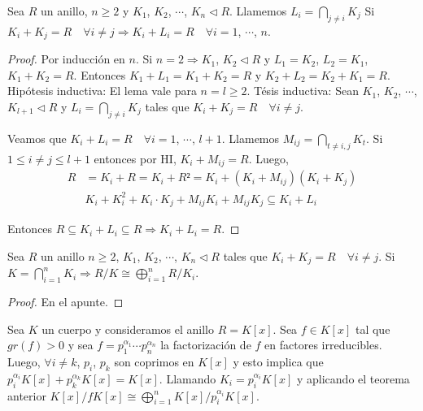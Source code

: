 \begin{lemma}
    Sea \(R\) un anillo, \(n \geq 2\) y \(K_1\), \(K_2\), \(\cdots\), \(K_n \triangleleft R\).
    Llamemos \(L_i = \bigcap_{j \neq i} K_j\) Si \(K_i + K_j = R \quad \forall i \neq j \Rightarrow K_i + L_i = R \quad \forall i = 1\), \(\cdots\), \(n\).
    \begin{proof}
        Por inducción en \(n\).
        Si \(n = 2 \Rightarrow K_1\), \(K_2 \triangleleft R\) y \(L_1 = K_2\), \(L_2 = K_1\), \(K_1 + K_2 = R\).
        Entonces \(K_1 + L_1 = K_1 + K_2 = R\) y \(K_2 + L_2 = K_2 + K_1 = R\).
        Hipótesis inductiva: El lema vale para \(n = l \geq 2\).
        Tésis inductiva: Sean \(K_1\), \(K_2\), \(\cdots\), \(K_{l+1} \triangleleft R\) y \(L_i = \bigcap_{j \neq i} K_j\) tales que \(K_i + K_j = R \quad \forall i \neq j\).

        Veamos que \(K_i + L_i = R \quad \forall i = 1\), \(\cdots\), \(l+1\).
        Llamemos \(M_{ij} = \bigcap_{t \neq i,j} K_t\). Si \(1 \leq i \neq j \leq l+1\) entonces por HI, \(K_i + M_{ij} = R\). Luego, \begin{align*}
            R & = K_i + R = K_i + R² = K_i + (K_i + M_{ij}) (K_i + K_j)                   \\
              & K_i + K_i^2 + K_i \cdot K_j + M_{ij} K_i + M_{ij} K_j \subseteq K_i + L_i
        \end{align*}

        Entonces \(R \subseteq K_i + L_i \subseteq R \Rightarrow K_i + L_i = R\).
    \end{proof}
\end{lemma}

\begin{theorem}
    Sea \(R\) un anillo \(n \geq 2\), \(K_1\), \(K_2\), \(\cdots\), \(K_n \triangleleft R\) tales que \(K_i + K_j = R \quad \forall i \neq j\).
    Si \(K = \bigcap_{i = 1}^n K_i \Rightarrow R/K \cong \bigoplus_{i = 1}^n R/K_i\).
    \begin{proof}
        En el apunte.
    \end{proof}
\end{theorem}

\begin{eg}
    Sea \(K\) un cuerpo y consideramos el anillo \(R = K[x]\).
    Sea \(f \in K[x]\) tal que \(gr(f) > 0\) y sea \(f = p_1^{\alpha_1} \cdots p_n^{\alpha_n}\) la factorización de \(f\) en factores irreducibles.
    Luego, \(\forall i \neq k\), \(p_i\), \(p_k\) son coprimos en \(K[x]\) y esto implica que \(p_i^{\alpha_i} K[x] + p_k^{\alpha_k} K[x] = K[x]\).
    Llamando \(K_i = p_i^{\alpha_i} K[x]\) y aplicando el teorema anterior \(K[x]/f K[x] \cong \bigoplus_{i = 1}^n K[x] / p_i^{\alpha_i} K[x]\).
\end{eg}


